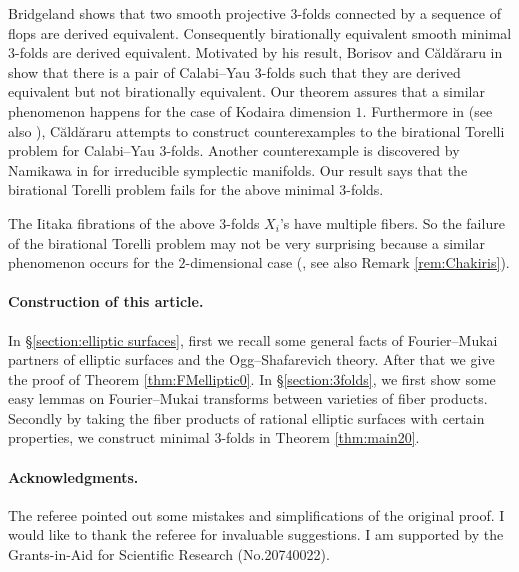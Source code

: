 \documentclass[a4paper,11pt]{article}
\theoremstyle{definition}\newtheorem{defn}[thm]{Definition}
\theoremstyle{remark}\newtheorem{remark}[thm]{Remark}
\numberwithin{equation}{section}
\begin{document}

Bridgeland \cite{Br02} shows that
two smooth projective $3$-folds connected by a sequence of flops
are derived equivalent.
Consequently birationally equivalent 
smooth minimal  $3$-folds are derived 
equivalent. Motivated by his result,
 Borisov and C\u{a}ld\u{a}raru in \cite{BC09} show
 that there is a pair of 
Calabi--Yau $3$-folds such that they are derived equivalent but 
not birationally equivalent. Our theorem assures that 
a similar phenomenon happens for the case of Kodaira dimension $1$.
Furthermore in \cite{Ca07} (see also \cite[Conjecture 0.2]{Sz04}), 
C\u{a}ld\u{a}raru attempts to construct counterexamples to the birational 
Torelli problem for  Calabi--Yau $3$-folds. 
Another counterexample is discovered by Namikawa in \cite{Na02} 
for irreducible symplectic manifolds.
Our result says that the birational 
Torelli problem fails for the above minimal $3$-folds.

The Iitaka fibrations of the above $3$-folds $X_i$'s   
have multiple fibers. So the failure of the birational 
Torelli problem may not be very surprising because 
a similar phenomenon occurs for the $2$-dimensional case (\cite{Ch80}, 
see also Remark \ref{rem:Chakiris}).



\paragraph{Construction of this article.}
In \S \ref{section:elliptic surfaces}, first we recall some general facts of 
Fourier--Mukai partners of elliptic surfaces and 
the Ogg--Shafarevich theory. After that we give the proof of 
Theorem \ref{thm:FMelliptic0}.
In \S \ref{section:3folds}, we first show some easy lemmas on 
Fourier--Mukai transforms between varieties of fiber products.
Secondly by taking the fiber products of 
rational  elliptic surfaces with certain properties,
we construct minimal  $3$-folds in Theorem \ref{thm:main20}.

\paragraph{Acknowledgments.}
The referee pointed out some mistakes and simplifications 
of the original proof.
I would like to thank the referee for invaluable suggestions.
I am supported by the Grants-in-Aid 
for Scientific Research (No.20740022). 
\end{document}
